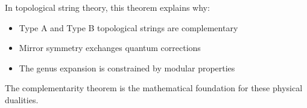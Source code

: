 \begin{remark}
\label{rem:string-theory-complementarity}
In topological string theory, this theorem explains why:
\begin{itemize}
\item Type A and Type B topological strings are complementary
\item Mirror symmetry exchanges quantum corrections
\item The genus expansion is constrained by modular properties
\end{itemize}
The complementarity theorem is the mathematical foundation for these physical dualities.
\end{remark}